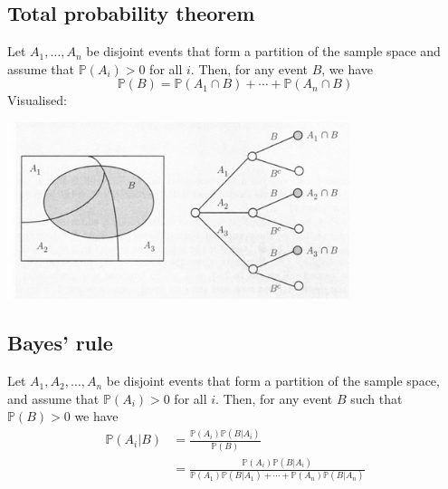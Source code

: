 \documentclass{report}
\begin{document}
\subsection{Total probability theorem}
Let $A_1,\ldots,A_n$ be disjoint events that form a partition of the sample space 
and assume that $\mathbb P(A_i)>0$ for all $i$. Then, for any event $B$, we have
\begin{equation*}
\mathbb P(B)=\mathbb P(A_1\cap B)+\cdots+\mathbb P(A_n\cap B)
\end{equation*}
Visualised:
\begin{center}
\includegraphics[width=10cm]{3}\\
\end{center}
\newpage

\subsection{Bayes' rule}
Let $A_1,A_2,\ldots,A_n$ be disjoint events that form a partition of the sample space, and assume that $\mathbb P(A_i)>0$ for all $i$. Then, for any event $B$ such that $\mathbb P(B)>0$ we have
\begin{align*}
\mathbb P(A_i|B)&=\frac{\mathbb P(A_i)\mathbb P(B|A_i)}{\mathbb P(B)}\\
&=\frac{\mathbb P(A_i)\mathbb P(B|A_i)}{\mathbb P(A_1)\mathbb P(B|A_1)+\cdots+
\mathbb P(A_n)\mathbb P(B|A_n)}
\end{align*}
\end{document}
